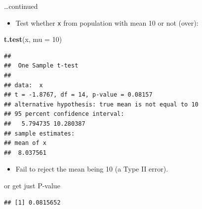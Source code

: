 \documentclass[ignorenonframetext,]{beamer}
\newenvironment{Shaded}{\begin{snugshade}}{\end{snugshade}}
\newcommand{\DataTypeTok}[1]{\textcolor[rgb]{0.13,0.29,0.53}{#1}}
\newcommand{\DecValTok}[1]{\textcolor[rgb]{0.00,0.00,0.81}{#1}}
\newcommand{\KeywordTok}[1]{\textcolor[rgb]{0.13,0.29,0.53}{\textbf{#1}}}
\newcommand{\NormalTok}[1]{#1}
\newcommand{\OperatorTok}[1]{\textcolor[rgb]{0.81,0.36,0.00}{\textbf{#1}}}
\providecommand{\tightlist}{%
  \setlength{\itemsep}{0pt}\setlength{\parskip}{0pt}}
\begin{document}
\begin{frame}[fragile]{\ldots{}continued}
\protect\hypertarget{continued}{}

\begin{itemize}
\tightlist
\item
  Test whether \texttt{x} from population with mean 10 or not (over):
\end{itemize}

\begin{Shaded}
\begin{Highlighting}[]
\KeywordTok{t.test}\NormalTok{(x, }\DataTypeTok{mu =} \DecValTok{10}\NormalTok{)}
\end{Highlighting}
\end{Shaded}

\begin{verbatim}
## 
##  One Sample t-test
## 
## data:  x
## t = -1.8767, df = 14, p-value = 0.08157
## alternative hypothesis: true mean is not equal to 10
## 95 percent confidence interval:
##   5.794735 10.280387
## sample estimates:
## mean of x 
##  8.037561
\end{verbatim}

\begin{itemize}
\tightlist
\item
  Fail to reject the mean being 10 (a Type II error).
\end{itemize}

\end{frame}

\begin{frame}[fragile]{or get just P-value}
\protect\hypertarget{or-get-just-p-value}{}

\begin{Shaded}
\end{Shaded}

\begin{verbatim}
## [1] 0.0815652
\end{verbatim}

\end{frame}
\end{document}
